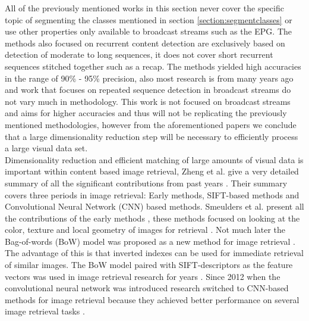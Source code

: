 \documentclass{article}
\begin{document}
All of the previously mentioned works in this section never cover the specific topic of segmenting the classes mentioned in section \ref{section:segmentclasses} or use other properties only available to broadcast streams such as the EPG. The methods also focused  on recurrent content detection are exclusively based on detection of moderate to long sequences, it does not cover short recurrent sequences stitched together such as a recap. The methods yielded high accuracies in the range of 90\% - 95\% precision, also most research is from many years ago and work that focuses on repeated sequence detection in broadcast streams do not vary much in methodology. This work is not focused on broadcast streams and aims for higher accuracies and thus will not be replicating the previously mentioned methodologies, however from the aforementioned papers we conclude that a large dimensionality reduction step will be necessary to efficiently process a large visual data set.
\\

Dimensionality reduction and efficient matching of large amounts of visual data is important within content based image retrieval, Zheng et al. give a very detailed summary of all the significant contributions from past years \cite{zheng2018sift}. Their summary covers three periods in image retrieval: Early methods, SIFT-based methods and Convolutional Neural Network (CNN) based methods. Smeulders et al. present all the contributions of the early methods \cite{smeulders2000content}, these methods focused on looking at the color, texture and local geometry of images for retrieval \cite{yu2002color,manjunath1996texture}. Not much later the Bag-of-words (BoW) model was proposed as a new method for image retrieval \cite{sivic2003video}. The advantage of this is that inverted indexes can be used for immediate retrieval of similar images. The BoW model paired with SIFT-descriptors \cite{lowe2004distinctive} as the feature vectors was used in image retrieval research for years \cite{nister2006scalable,philbin2007object,jegou2008hamming,jegou2010aggregating,jegou2012aggregating}. Since 2012 when the convolutional neural network was introduced \cite{krizhevsky2012imagenet} research switched to CNN-based methods for image retrieval because they achieved better performance on several image retrieval tasks	 \cite{babenko2014neural,yue2015exploiting, tolias2015particular}.


\iffalse
\cite{li2000automatic} %

\cite{lienhart1997detection} %
\cite{covell2006advertisement} %
\end{document}
